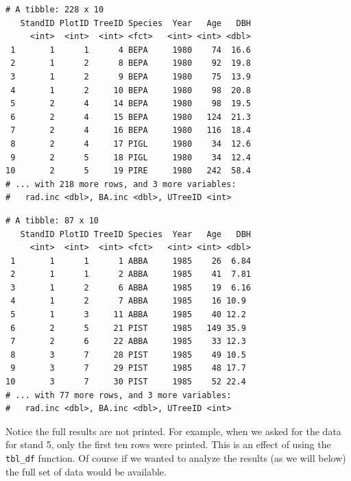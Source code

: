 \documentclass[]{krantz}
\makeatletter
\newenvironment{Shaded}{\begin{snugshade}}{\end{snugshade}}
\newcommand{\KeywordTok}[1]{\textcolor[rgb]{0.27,0.27,0.27}{\textbf{#1}}}
\newcommand{\DecValTok}[1]{\textcolor[rgb]{0.06,0.06,0.06}{#1}}
\newcommand{\StringTok}[1]{\textcolor[rgb]{0.5,0.5,0.5}{#1}}
\newcommand{\OperatorTok}[1]{\textcolor[rgb]{0.43,0.43,0.43}{\textbf{#1}}}
\newcommand{\NormalTok}[1]{#1}
\newenvironment{kframe}{%
\medskip{}
\setlength{\fboxsep}{.8em}
 \def\at@end@of@kframe{}%
 \ifinner\ifhmode%
  \def\at@end@of@kframe{\end{minipage}}%
  \begin{minipage}{\columnwidth}%
 \fi\fi%
 \def\FrameCommand##1{\hskip\@totalleftmargin \hskip-\fboxsep
 \colorbox{shadecolor}{##1}\hskip-\fboxsep
     \hskip-\linewidth \hskip-\@totalleftmargin \hskip\columnwidth}%
 \MakeFramed {\advance\hsize-\width
   \@totalleftmargin\z@ \linewidth\hsize
   \@setminipage}}%
 {\par\unskip\endMakeFramed%
 \at@end@of@kframe}
\renewenvironment{Shaded}{\begin{kframe}}{\end{kframe}}
\theoremstyle{definition}
\theoremstyle{definition}
\theoremstyle{definition}
\theoremstyle{remark}
\makeatother
\begin{document}
\begin{verbatim}
# A tibble: 228 x 10
   StandID PlotID TreeID Species  Year   Age   DBH
     <int>  <int>  <int> <fct>   <int> <int> <dbl>
 1       1      1      4 BEPA     1980    74  16.6
 2       1      2      8 BEPA     1980    92  19.8
 3       1      2      9 BEPA     1980    75  13.9
 4       1      2     10 BEPA     1980    98  20.8
 5       2      4     14 BEPA     1980    98  19.5
 6       2      4     15 BEPA     1980   124  21.3
 7       2      4     16 BEPA     1980   116  18.4
 8       2      4     17 PIGL     1980    34  12.6
 9       2      5     18 PIGL     1980    34  12.4
10       2      5     19 PIRE     1980   242  58.4
# ... with 218 more rows, and 3 more variables:
#   rad.inc <dbl>, BA.inc <dbl>, UTreeID <int>
\end{verbatim}

\begin{Shaded}
\end{Shaded}

\begin{verbatim}
# A tibble: 87 x 10
   StandID PlotID TreeID Species  Year   Age   DBH
     <int>  <int>  <int> <fct>   <int> <int> <dbl>
 1       1      1      1 ABBA     1985    26  6.84
 2       1      1      2 ABBA     1985    41  7.81
 3       1      2      6 ABBA     1985    19  6.16
 4       1      2      7 ABBA     1985    16 10.9 
 5       1      3     11 ABBA     1985    40 12.2 
 6       2      5     21 PIST     1985   149 35.9 
 7       2      6     22 ABBA     1985    33 12.3 
 8       3      7     28 PIST     1985    49 10.5 
 9       3      7     29 PIST     1985    48 17.7 
10       3      7     30 PIST     1985    52 22.4 
# ... with 77 more rows, and 3 more variables:
#   rad.inc <dbl>, BA.inc <dbl>, UTreeID <int>
\end{verbatim}

Notice the full results are not printed. For example, when we asked for
the data for stand 5, only the first ten rows were printed. This is an
effect of using the \texttt{tbl\_df} function. Of course if we wanted to
analyze the results (as we will below) the full set of data would be
available.
\end{document}
